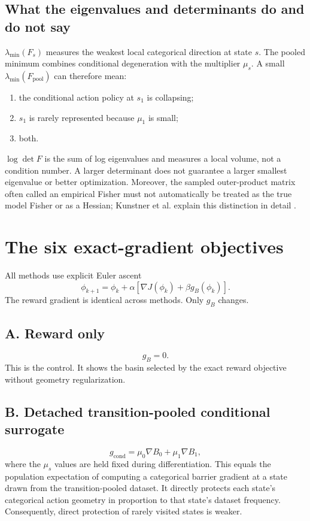 \documentclass[10pt,a4paper]{article}
\newcommand{\pool}{\mathrm{pool}}
\begin{document}
\subsection{What the eigenvalues and determinants do and do not say}

$\lambda_{\min}(F_s)$ measures the weakest local categorical direction at state
$s$.  The pooled minimum combines conditional degeneration with the multiplier
$\mu_s$.  A small $\lambda_{\min}(F_{\pool})$ can therefore mean:
\begin{enumerate}
\item the conditional action policy at $s_1$ is collapsing;
\item $s_1$ is rarely represented because $\mu_1$ is small;
\item both.
\end{enumerate}
$\log\det F$ is the sum of log eigenvalues and measures a local volume, not a
condition number.  A larger determinant does not guarantee a larger smallest
eigenvalue or better optimization.  Moreover, the sampled outer-product matrix
often called an empirical Fisher must not automatically be treated as the true
model Fisher or as a Hessian; Kunstner et al. explain this distinction in detail
\cite{Kunstner2019}.

\section{The six exact-gradient objectives}

All methods use explicit Euler ascent
\begin{equation}
\phi_{k+1}=\phi_k+\alpha[\nabla J(\phi_k)+\beta g_B(\phi_k)].
\label{eq:update}
\end{equation}
The reward gradient is identical across methods.  Only $g_B$ changes.

\subsection{A. Reward only}
\begin{equation}
g_B=0.
\end{equation}
This is the control.  It shows the basin selected by the exact reward objective
without geometry regularization.

\subsection{B. Detached transition-pooled conditional surrogate}
\begin{equation}
g_{\mathrm{cond}}
=\mu_0\nabla B_0+\mu_1\nabla B_1,
\label{eq:conditional}
\end{equation}
where the $\mu_s$ values are held fixed during differentiation.  This equals
the population expectation of computing a categorical barrier gradient at a
state drawn from the transition-pooled dataset.  It directly protects each
state's categorical action geometry in proportion to that state's dataset
frequency.  Consequently, direct protection of rarely visited states is weaker.
\end{document}
